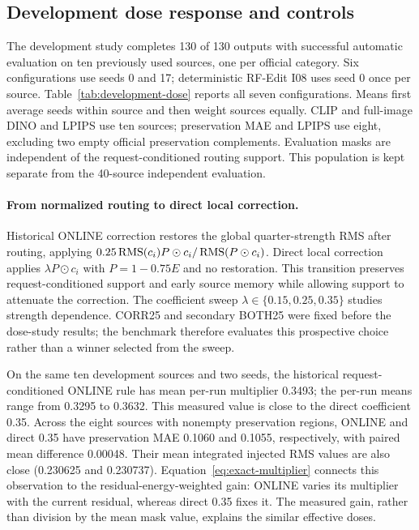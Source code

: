\subsection{Development dose response and controls}
\label{sec:development-dose}
The development study completes 130 of 130 outputs with successful automatic evaluation on ten previously used sources, one per official category. Six configurations use seeds 0 and 17; deterministic RF-Edit I08 uses seed 0 once per source. Table~\ref{tab:development-dose} reports all seven configurations. Means first average seeds within source and then weight sources equally. CLIP and full-image DINO and LPIPS use ten sources; preservation MAE and LPIPS use eight, excluding two empty official preservation complements. Evaluation masks are independent of the request-conditioned routing support. This population is kept separate from the 40-source independent evaluation.

\paragraph{From normalized routing to direct local correction.}
Historical ONLINE correction restores the global quarter-strength RMS after routing, applying $0.25\operatorname{RMS}(c_i)P\odot c_i/\operatorname{RMS}(P\odot c_i)$. Direct local correction applies $\lambda P\odot c_i$ with $P=1-0.75E$ and no restoration. This transition preserves request-conditioned support and early source memory while allowing support to attenuate the correction. The coefficient sweep $\lambda\in\{0.15,0.25,0.35\}$ studies strength dependence. CORR25 and secondary BOTH25 were fixed before the dose-study results; the benchmark therefore evaluates this prospective choice rather than a winner selected from the sweep.

On the same ten development sources and two seeds, the historical request-conditioned ONLINE rule has mean per-run multiplier 0.3493; the per-run means range from 0.3295 to 0.3632. This measured value is close to the direct coefficient 0.35. Across the eight sources with nonempty preservation regions, ONLINE and direct 0.35 have preservation MAE 0.1060 and 0.1055, respectively, with paired mean difference 0.00048. Their mean integrated injected RMS values are also close (0.230625 and 0.230737). Equation~\eqref{eq:exact-multiplier} connects this observation to the residual-energy-weighted gain: ONLINE varies its multiplier with the current residual, whereas direct 0.35 fixes it. The measured gain, rather than division by the mean mask value, explains the similar effective doses.

